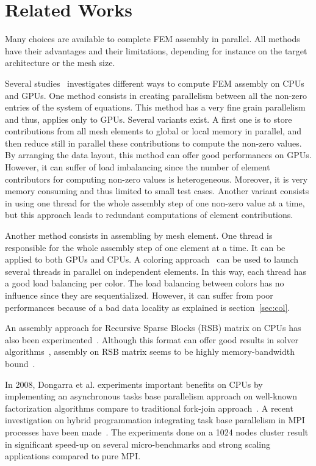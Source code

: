 \documentclass{IOS-Book-Article}
\begin{document}
\section{Related Works}
Many choices are available to complete FEM assembly in parallel.
All methods have their advantages and their limitations, depending for instance on the target architecture or the mesh size.

Several studies~\cite{cecka2011assembly,CPUGPUasm} investigates different ways to compute FEM assembly on CPUs and GPUs.
One method consists in creating parallelism between all the non-zero entries of the system of equations.
This method has a very fine grain parallelism and thus, applies only to GPUs. Several variants exist.
A first one is to store contributions from all mesh elements to global or local memory in parallel, and then reduce still in parallel these contributions to compute
the non-zero values.
By arranging the data layout, this method can offer good performances on GPUs.
However, it can suffer of load imbalancing since the number of element contributors for computing non-zero values is heterogeneous.
Moreover, it is very memory consuming and thus limited to small test cases.
Another variant consists in using one thread for the whole assembly step of one non-zero value at a time, but this approach leads to redundant computations of element
contributions.

Another method consists in assembling by mesh element. One thread is responsible for the whole assembly step of one element at a time. It can be applied to both GPUs and CPUs.
A coloring approach~\cite{CUDAfe,CPUfe} can be used to launch several threads in parallel on independent elements.
In this way, each thread has a good load balancing per color. The load balancing between colors has no influence since they are sequentialized.
However, it can suffer from poor performances because of a bad data locality as explained is section~\ref{sec:col}.

An assembly approach for Recursive Sparse Blocks (RSB) matrix on CPUs has also been experimented~\cite{RSBasm}.
Although this format can offer good results in solver algorithms~\cite{RSBsolver}, assembly on RSB matrix seems to be highly memory-bandwidth bound~\cite{RSBasm}.

In 2008, Dongarra et al. experiments important benefits on CPUs by implementing an asynchronous tasks base parallelism approach on well-known factorization algorithms
compare to traditional fork-join approach~\cite{Dongarra}.
A recent investigation on hybrid programmation integrating task base parallelism in MPI processes have been made~\cite{MPIhybid}.
The experiments done on a 1024 nodes cluster result in significant speed-up on several micro-benchmarks and strong scaling applications compared to pure MPI.
\end{document}
